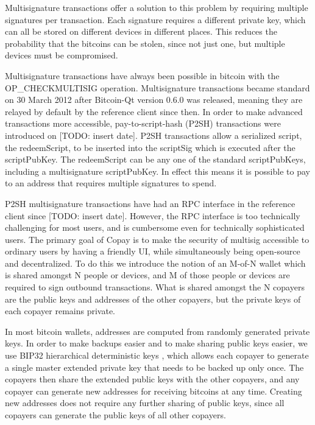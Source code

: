 \documentclass{article}
\begin{document}
Multisignature transactions offer a solution to this problem by requiring multiple signatures per transaction.
Each signature requires a different private key, which can all be stored on different devices in different places.
This reduces the probability that the bitcoins can be stolen, since not just one, but multiple devices must be compromised.

Multisignature transactions have always been possible in bitcoin with the OP\_CHECKMULTISIG \cite{bip11} operation. Multisignature transactions became standard on 30 March 2012\cite{bc0.6.0} after Bitcoin-Qt version 0.6.0 was released, meaning they are relayed by default by the reference client since then.
In order to make advanced transactions more accessible, pay-to-script-hash (P2SH)\cite{bip16} transactions were introduced on [TODO: insert date].
P2SH transactions allow a serialized script, the redeemScript, to be inserted into the scriptSig which is executed after the scriptPubKey.
The redeemScript can be any one of the standard scriptPubKeys, including a multisignature scriptPubKey.
In effect this means it is possible to pay to an address that requires multiple signatures to spend.

P2SH multisignature transactions have had an RPC interface in the reference client since [TODO: insert date].
However, the RPC interface is too technically challenging for most users, and is cumbersome even for technically sophisticated users.
The primary goal of Copay is to make the security of multisig accessible to ordinary users by having a friendly UI, while simultaneously being open-source and decentralized.
To do this we introduce the notion of an M-of-N wallet which is shared amongst N people or devices, and M of those people or devices are required to sign outbound transactions.
What is shared amongst the N copayers are the public keys and addresses of the other copayers, but the private keys of each copayer remains private.

In most bitcoin wallets, addresses are computed from randomly generated private keys.
In order to make backups easier and to make sharing public keys easier, we use BIP32 hierarchical deterministic keys \cite{bip32}, which allows each copayer to generate a single master extended private key that needs to be backed up only once.
The copayers then share the extended public keys with the other copayers, and any copayer can generate new addresses for receiving bitcoins at any time.
Creating new addresses does not require any further sharing of public keys, since all copayers can generate the public keys of all other copayers.
\end{document}
